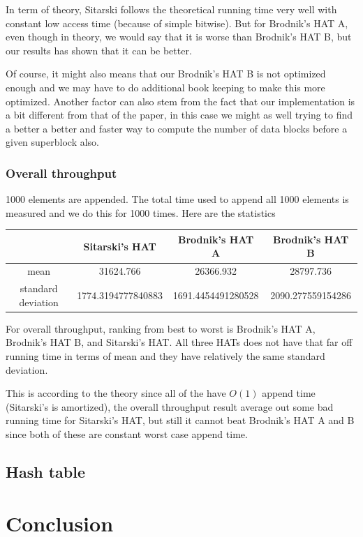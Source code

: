 \documentclass{article} %
\begin{document}
    In term of theory, Sitarski follows the theoretical running time very well with constant low access time (because of simple bitwise).
    But for Brodnik's HAT A, even though in theory, we would say that it is worse than Brodnik's HAT B, but our results has shown that it can be better.

    Of course, it might also means that our Brodnik's HAT B is not optimized enough and we may have to do additional book keeping to make this more optimized.
    Another factor can also stem from the fact that our implementation is a bit different from that of the paper, in this case we might as well trying to find a better
    a better and faster way to compute the number of data blocks before a given superblock also.

    \subsubsection*{Overall throughput}
    1000 elements are appended. The total time used to append all 1000 elements is measured and we do this for 1000 times.
    Here are the statistics
    \begin{center}
        \begin{tabular}{|c|c|c|c|}\hline
            & Sitarski's HAT & Brodnik's HAT A & Brodnik's HAT B\\\hline
            mean &  31624.766 & 26366.932 & 28797.736\\\hline
            standard deviation & 1774.3194777840883  & 1691.4454491280528 & 2090.277559154286\\\hline 
        \end{tabular}
    \end{center}
    For overall throughput, ranking from best to worst is Brodnik's HAT A, Brodnik's HAT B, and Sitarski's HAT.
    All three HATs does not have that far off running time in terms of mean and they have relatively the same standard deviation.

    This is according to the theory since all of the have $O(1)$ append time (Sitarski's is amortized), the overall throughput result
    average out some bad running time for Sitarski's HAT, but still it cannot beat Brodnik's HAT A and B since both of these are constant worst case append time.
    
    \subsection*{Hash table}

    \section*{Conclusion}
\end{document}
